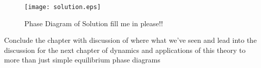 \begin{figure}
    \centering	
    \texttt{[image: solution.eps]}
    \caption[Coexistance Phase Diagram with Metastable Spinodal]{
        \label{precip} Phase Diagram of Solution \color{ForestGreen} fill
        me in please!!
    }
\end{figure}


{
    \color{ForestGreen} Conclude the chapter with discussion of where what we've
    seen and lead into the discussion for the next chapter of dynamics and
    applications of this theory to more than just simple equilibrium 
    phase diagrams
}
